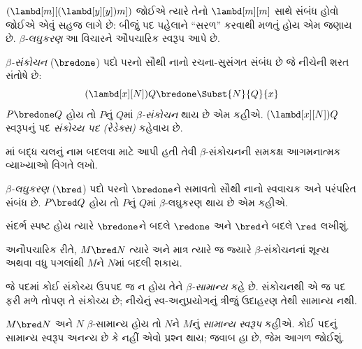 \documentclass[../../../include/open-logic-section]{subfiles}
\begin{document}

$(\lambd[m][(\lambd[y][y]) m])$ જોઈએ ત્યારે તેનો
$\lambd[m][m]$ સાથે સંબંધ હોવો જોઈએ એવું સહજ લાગે છે:
બીજું પદ પહેલાને ``સરળ'' કરવાથી મળતું હોય એમ જણાય છે.
\emph{$\beta$-લઘુકરણ} આ વિચારને ઔપચારિક સ્વરૂપ આપે છે.

\begin{defn} 
  \emph{$\beta$-સંકોચન} ($\bredone$) પદો પરનો સૌથી
  નાનો રચના-સુસંગત સંબંધ છે જે નીચેની શરત સંતોષે છે:
  \[
    (\lambd[x][N])Q \bredone \Subst{N}{Q}{x} 
  \]
  $P \bredone Q$ હોય તો $P$નું $Q$માં
  \emph{$\beta$-સંકોચન} થાય છે એમ કહીએ. $(\lambd[x][N])Q$
  સ્વરૂપનું પદ \emph{સંકોચ્ય પદ (રેડેક્સ)} કહેવાય છે.
\end{defn}

\begin{prob} 
  માં બદ્ધ ચલનું નામ
  બદલવા માટે આપી હતી તેવી $\beta$-સંકોચનની સમકક્ષ
  આગમનાત્મક વ્યાખ્યાઓ વિગતે લખો.
\end{prob}
  
\begin{defn} 
  \emph{$\beta$-લઘુકરણ} ($\bred$) પદો પરનો
  $\bredone$ને સમાવતો સૌથી નાનો સ્વવાચક અને
  પરંપરિત સંબંધ છે. $P \bred Q$ હોય તો $P$નું
  $Q$માં $\beta$-લઘુકરણ થાય છે એમ કહીએ.
\end{defn}

સંદર્ભ સ્પષ્ટ હોય ત્યારે $\bredone$ને બદલે $\redone$
અને $\bred$ને બદલે $\red$ લખીશું.

અનૌપચારિક રીતે, $M \bred N$ ત્યારે અને માત્ર ત્યારે જ
જ્યારે $\beta$-સંકોચનનાં શૂન્ય અથવા વધુ પગલાંથી
$M$ને $N$માં બદલી શકાય.

\begin{defn}[$\beta$-સામાન્ય]
જે પદમાં કોઈ સંકોચ્ય ઉપપદ જ ન હોય તેને
\emph{$\beta$-સામાન્ય} કહે છે.
સંકોચનથી એ જ પદ ફરી મળે તોપણ તે સંકોચ્ય છે; નીચેનું
સ્વ-અનુપ્રયોગનું ત્રીજું ઉદાહરણ તેથી સામાન્ય નથી.
\end{defn}

$M \bred N$ અને $N$ $\beta$-સામાન્ય હોય તો $N$ને
$M$નું \emph{સામાન્ય સ્વરૂપ} કહીએ. કોઈ પદનું સામાન્ય
સ્વરૂપ અનન્ય છે કે નહીં એવો પ્રશ્ન થાય; જવાબ હા છે,
જેમ આગળ જોઈશું.
\end{document}
